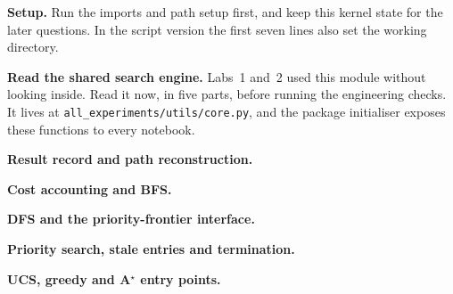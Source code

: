 \textbf{Setup.} Run the imports and path setup first, and keep this kernel state for the later questions. In the script version the first seven lines also set the working directory.



\textbf{Read the shared search engine.} Labs~1 and~2 used this module without looking inside. Read it now, in five parts, before running the engineering checks. It lives at \texttt{all\_experiments/utils/core.py}, and the package initialiser exposes these functions to every notebook.

\noindent\textbf{Result record and path reconstruction.}

\noindent\textbf{Cost accounting and BFS.}

\noindent\textbf{DFS and the priority-frontier interface.}

\noindent\textbf{Priority search, stale entries and termination.}

\noindent\textbf{UCS, greedy and A$^\star$ entry points.}


